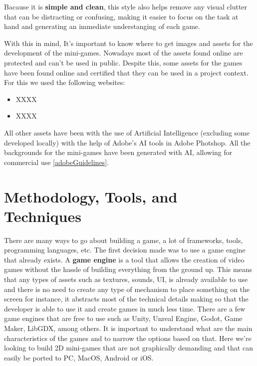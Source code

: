 Bacause it is \textbf{simple and clean}, this style also helps remove any visual clutter that can be distracting or confusing, making it easier to focus on the task at hand and generating an immediate understanging of each game.

With this in mind, It's important to know where to get images and assets for the development of the mini-games. Nowadays most of the assets found online are protected and can't be used in public. Despite this, some assets for the games have been found online and certified that they can be used in a project context. For this we used the following websites:

\begin{itemize}
    \item XXXX
    \item XXXX
\end{itemize}

All other assets have been with the use of Artificial Intelligence (excluding some developed locally) with the help of Adobe's AI tools in Adobe Photshop. All the backgrounds for the mini-games have been generated with AI, allowing for commercial use \ref{adobeGuidelines}.



\newpage
\section{Methodology, Tools, and Techniques}
There are many ways to go about building a game, a lot of frameworks, tools, programming languages, etc. The first decision made was to use a game engine that already exists. A \textbf{game engine} is a tool that allows the creation of video games without the hassle of building everything from the ground up. This means that any types of assets such as textures, sounds, UI, is already available to use and there is no need to create any type of mechanism to place something on the screen for instance, it abstracts most of the technical details making so that the developer is able to use it and create games in much less time. There are a few game engines that are free to use such as Unity, Unreal Engine, Godot, Game Maker, LibGDX, among others.
It is important to understand what are the main characteristics of the games and to narrow the options based on that.
Here we're looking to build 2D mini-games that are not graphically demanding and that can easily be ported to PC, MacOS, Android or iOS.

